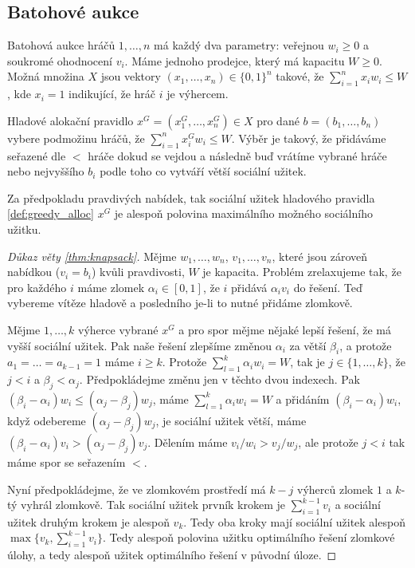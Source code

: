 \subsection{Batohové aukce}
\begin{definition}
\label{def:knapsack}
  Batohová aukce hráčů $1,\dots,n$ má každý dva parametry: veřejnou $w_i \geq 0$ a soukromé ohodnocení $v_i$. 
  Máme jednoho prodejce, který má kapacitu $W \geq 0$. 
  Možná množina $X$ jsou vektory $(x_1,\dots,x_n) \in \{0,1\}^n$ takové, že $\sum_{i=1}^n x_iw_i \leq W$, kde $x_i = 1$ indikující, že hráč $i$ je výhercem. 
\end{definition}
\begin{definition}
\label{def:greedy_alloc}
    Hladové alokační pravidlo $x^G = (x_1^G, \dots, x_n^G) \in X$ pro dané $b = (b_1,\dots,b_n)$ vybere podmožinu hráčů, že $\sum_{i=1}^n x^G_i w_i \leq W$. 
    Výběr je takový, že přidáváme seřazené dle $<$ hráče dokud se vejdou a následně buď vrátíme vybrané hráče nebo nejvyššího $b_i$ podle toho co vytváří větší sociální užitek. 
\end{definition}

\begin{theorem}
\label{thm:knapsack}
    Za předpokladu pravdivých nabídek, tak sociální užitek hladového pravidla \ref{def:greedy_alloc} $x^G$ je alespoň polovina maximálního možného sociálního užitku. 
\end{theorem}
\begin{proof}[Důkaz věty \ref{thm:knapsack}]
   Mějme $w_1,\dots, w_n$, $v_1,\dots,v_n$, které jsou zároveň nabídkou ($v_i = b_i$) kvůli pravdivosti, $W$ je kapacita. 
   Problém zrelaxujeme tak, že pro každého $i$ máme zlomek $\alpha_i \in [0,1]$, že $i$ přidává $\alpha_iv_i$ do řešení. 
   Teď vybereme vítěze hladově a posledního je-li to nutné přidáme zlomkově. 

   Mějme $1,\dots,k$ výherce vybrané $x^G$ a pro spor mějme nějaké lepší řešení, že má vyšší sociální užitek. 
   Pak naše řešení zlepšíme změnou $\alpha_i$ za větší $\beta_i$, a protože $a_1=\dots=a_{k-1} = 1$ máme $i \geq k$. 
   Protože $\sum^k_{l=1} \alpha_i w_i = W$, tak je $j\in \{1,\dots,k\}$, že $j<i$ a $\beta_j < \alpha_j$. 
   Předpokládejme změnu jen v těchto dvou indexech. 
   Pak $(\beta_i-\alpha_i)w_i \leq (\alpha_j-\beta_j)w_j$, máme $\sum^k_{l=1} \alpha_i w_i = W$ a přidáním $(\beta_i-\alpha_i)w_i$, když odebereme $(\alpha_j-\beta_j)w_j$, je sociální užitek větší, máme $(\beta_i-\alpha_i)v_i > (\alpha_j-\beta_j)v_j$. 
   Dělením máme $v_i/w_i > v_j/w_j$, ale protože $j<i$ tak máme spor se seřazením $<$. 

   Nyní předpokládejme, že ve zlomkovém prostředí má $k-j$ výherců zlomek $1$ a $k$-tý vyhrál zlomkově. 
   Tak sociální užitek prvník krokem je $\sum^{k-1}_{i=1} v_i$ a sociální užitek druhým krokem je alespoň $v_k$. 
   Tedy oba kroky mají sociální užitek alespoň $\max\{v_k, \sum^{k-1}_{i=1} v_i\}$. 
   Tedy alespoň polovina užitku optimálního řešení zlomkové úlohy, a tedy alespoň užitek optimálního řešení v původní úloze. 
\end{proof}


